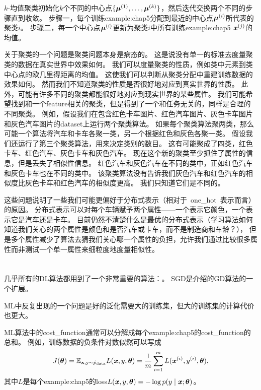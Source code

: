 $k$-均值聚类初始化$k$个不同的中心点$\{\boldsymbol{\mu}^{(1)},\dots,\boldsymbol{\mu}^{(k)}\}$，然后迭代交换两个不同的步骤直到收敛。
步骤一，每个训练\gls{example:chap5}分配到最近的中心点$\boldsymbol{\mu}^{(i)}$所代表的聚类$i$。
步骤二，每一个中心点$\boldsymbol{\mu}^{(i)}$更新为聚类$i$中所有训练\gls{example:chap5} $\boldsymbol{\mathit{x}}^{(j)}$的均值。

关于聚类的一个问题是聚类问题本身是病态的。
这是说没有单一的标准去度量聚类的数据在真实世界中效果如何。
我们可以度量聚类的性质，例如类中元素到类中心点的欧几里得距离的均值。
这使我们可以判断从聚类分配中重建训练数据的效果如何。
然而我们不知道聚类的性质是否很好地对应到真实世界的性质。
此外，可能有许多不同的聚类都能很好地对应到现实世界的某些属性。
我们可能希望找到和一个\gls{feature}相关的聚类，但是得到了一个和任务无关的，同样是合理的不同聚类。
例如，假设我们在包含红色卡车图片、红色汽车图片、灰色卡车图片和灰色汽车图片的\gls{dataset}上运行两个聚类算法。
如果每个聚类算法聚两类，那么可能一个算法将汽车和卡车各聚一类，另一个根据红色和灰色各聚一类。
假设我们还运行了第三个聚类算法，用来决定类别的数目。
这有可能聚成了四类，红色卡车、红色汽车、灰色卡车和灰色汽车。
现在这个新的聚类至少抓住了属性的信息，但是丢失了相似性信息。
红色汽车和灰色汽车在不同的类中，正如红色汽车和灰色卡车也在不同的类中。
该聚类算法没有告诉我们灰色汽车和红色汽车的相似度比灰色卡车和红色汽车的相似度更高。
我们只知道它们是不同的。


这些问题说明了一些我们可能更偏好于分布式表示（相对于~\gls{one_hot}~表示而言）的原因。
分布式表示可以对每个车辆赋予两个属性——一个表示它颜色，一个表示它是汽车还是卡车。
目前仍然不清楚什么是最优的分布式表示（学习算法如何知道我们关心的两个属性是颜色和是否汽车或卡车，而不是制造商和车龄？），
但是多个属性减少了算法去猜我们关心哪一个属性的负担，允许我们通过比较很多属性而非测试一个单一属性来细粒度地度量相似性。

\section{}
\label{sec:stochastic_gradient_descent_chap5}
几乎所有的\gls{DL}算法都用到了一个非常重要的算法：。
\gls{SGD}是介绍的\gls{GD}算法的一个扩展。

\gls{ML}中反复出现的一个问题是好的泛化需要大的训练集，但大的训练集的计算代价也更大。


\gls{ML}算法中的\gls{cost_function}通常可以分解成每个\gls{example:chap5}的\gls{cost_function}的总和。
例如，训练数据的负条件对数似然可以写成
\begin{equation}
    J(\boldsymbol{\theta}) = \mathbb{E}_{\mathbf{x},\mathrm{y} \sim \hat{p}_{\text{data}}}
    L(\boldsymbol{\mathit{x}}, y, \boldsymbol{\theta}) = 
    \frac{1}{m} \sum_{i=1}^m  L(\boldsymbol{\mathit{x}}^{(i)}, y^{(i)}, \boldsymbol{\theta}) ,
\end{equation}
其中$L$是每个\gls{example:chap5}的\gls{loss}$L(\boldsymbol{\mathit{x}}, y, \boldsymbol{\theta}) = -\log p(y\mid\boldsymbol{\mathit{x}};\boldsymbol{\theta})$。

